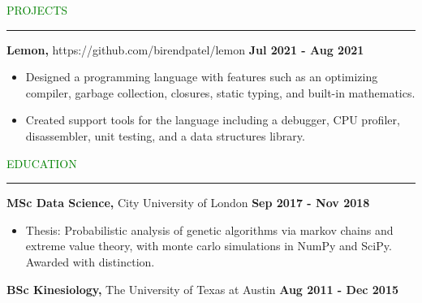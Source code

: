 \documentclass [
        11pt
] {article}
\begin{document}
\noindent\textcolor{green}{PROJECTS \rule{16cm}{1pt}}

\vspace*{10pt}

\noindent \textbf {Lemon,} https://github.com/birendpatel/lemon
\hspace*{\fill} \textbf{Jul 2021 - Aug 2021}

\begin{itemize}[noitemsep,topsep=0pt]
\renewcommand{\labelitemi}{\scriptsize$\blacksquare$}

\item Designed a programming language with features such as an optimizing
compiler, garbage collection, closures, static typing, and built-in
mathematics.

\vspace*{5pt}

\item Created support tools for the language including a debugger, CPU profiler,
disassembler, unit testing, and a data structures library.

\end{itemize}

\vspace*{10pt}


\noindent\textcolor{green}{EDUCATION \rule{16cm}{1pt}}

\vspace*{10pt}

\noindent \textbf {MSc Data Science,} City University of London
\hspace*{\fill} \textbf{Sep 2017 - Nov 2018}

\begin{itemize}[noitemsep,topsep=0pt]
\renewcommand{\labelitemi}{\scriptsize$\blacksquare$}
\item Thesis: Probabilistic analysis of genetic algorithms via markov chains
and extreme value theory, with monte carlo simulations in NumPy and SciPy.
Awarded with distinction.
\end{itemize}

\noindent \textbf {BSc Kinesiology,} The University of Texas at Austin
\hspace*{\fill} \textbf{Aug 2011 - Dec 2015}
\end{document}
